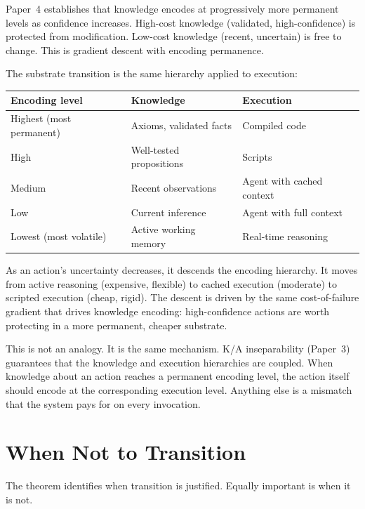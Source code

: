 \documentclass[11pt]{article}
\theoremstyle{definition}
\begin{document}
Paper~4 \cite{McCarthy2026d} establishes that knowledge encodes at
progressively more permanent levels as confidence increases. High-cost
knowledge (validated, high-confidence) is protected from modification.
Low-cost knowledge (recent, uncertain) is free to change. This is
gradient descent with encoding permanence.

The substrate transition is the same hierarchy applied to execution:

\begin{center}
\begin{tabular}{lll}
\toprule
\textbf{Encoding level} & \textbf{Knowledge} & \textbf{Execution} \\
\midrule
Highest (most permanent) & Axioms, validated facts & Compiled code \\
High & Well-tested propositions & Scripts \\
Medium & Recent observations & Agent with cached context \\
Low & Current inference & Agent with full context \\
Lowest (most volatile) & Active working memory & Real-time reasoning \\
\bottomrule
\end{tabular}
\end{center}

As an action's uncertainty decreases, it descends the encoding
hierarchy. It moves from active reasoning (expensive, flexible) to
cached execution (moderate) to scripted execution (cheap, rigid).
The descent is driven by the same cost-of-failure gradient that
drives knowledge encoding: high-confidence actions are worth
protecting in a more permanent, cheaper substrate.

This is not an analogy. It is the same mechanism. K/A inseparability
(Paper~3) guarantees that the knowledge and execution hierarchies are
coupled. When knowledge about an action reaches a permanent encoding
level, the action itself should encode at the corresponding execution
level. Anything else is a mismatch that the system pays for on every
invocation.

\section{When Not to Transition}
\label{sec:exceptions}

The theorem identifies when transition is justified. Equally important
is when it is not.
\end{document}
